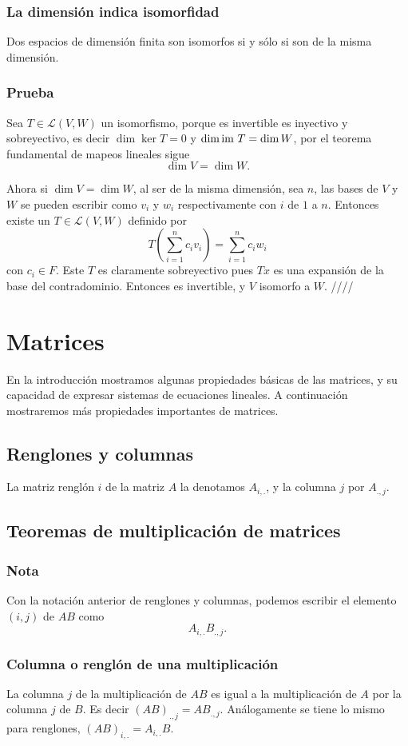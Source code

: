 \documentclass{article}
\begin{document}
\subsubsection{La dimensión indica isomorfidad}
Dos espacios de dimensión finita son isomorfos
si y sólo si son de la misma dimensión.
\subsubsection*{Prueba}
Sea $T\in\mathcal{L}(V,W)$ un isomorfismo, porque es invertible es 
inyectivo y sobreyectivo, es decir $\dim\ker T = 0$ y
$\dim\text{im } T = \dim W$, por el teorema fundamental de mapeos lineales
sigue $$\dim V = \dim W.$$

Ahora si $\dim V = \dim W$, al ser de la misma dimensión, sea $n$, las 
bases de $V$ y $W$ se pueden escribir como $v_i$ y $w_i$ 
respectivamente con $i$ de $1$ a $n$. Entonces existe un 
$T\in\mathcal{L}(V,W)$ definido por
$$T\left(\sum^n_{i=1}c_i v_i\right) = \sum^n_{i=1}c_i w_i$$
con $c_i\in F$. Este $T$ es claramente sobreyectivo pues $Tx$ es una
expansión de la base del contradominio. Entonces es invertible, y
$V$ isomorfo a $W$. \hfill ////

\newpage

\section{Matrices}
En la introducción mostramos algunas propiedades básicas de las
matrices, y su capacidad de expresar sistemas de ecuaciones lineales.
A continuación mostraremos más propiedades importantes de matrices.

\subsection{Renglones y columnas}
La matriz renglón $i$ de la matriz $A$ la denotamos
$A_{i,.}$, y la columna $j$ por $A_{.,j}$.

\subsection{Teoremas de multiplicación de matrices}
\subsubsection*{Nota}
Con la notación anterior de renglones y columnas, podemos
escribir el elemento $(i,j)$ de $AB$ como
$$A_{i,.} B_{.,j}.$$

\subsubsection{Columna o renglón de una multiplicación}
La columna $j$ de la multiplicación de $AB$ es igual a la
multiplicación de $A$ por la columna $j$ de $B$. Es decir
$(AB)_{.,j} = A B_{.,j}$. Análogamente se tiene lo mismo para renglones,
$(AB)_{i,.} = A_{i,.} B$.
\end{document}
